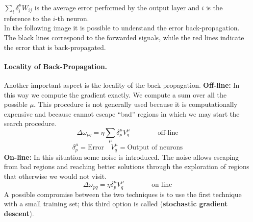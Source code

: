 $\sum_{i} \delta_{i}^{\mu} W_{ij}$ is the average error performed by the output layer and $i$ is the reference to the $i$-th neuron.\\
In the following image it is possible to understand the error back-propagation. The black lines correspond to the forwarded signals, while the red lines indicate the error that is back-propagated.

\paragraph*{Locality of Back-Propagation.} Another important aspect is the locality of the back-propagation.
\textbf{Off-line:} In this way we compute the gradient exactly. We compute a sum over all the possible $\mu$. This procedure is not generally used because it is computationally expensive and because cannot escape ``bad'' regions in which we may start the search procedure.
$$\Delta \omega_{pq} = \eta \sum_{\mu} \delta_{p}^{\mu} V_{q}^{\mu} \qquad \qquad \text{off-line}$$
$$\delta_{p}^{\mu} = \text{Error} \quad V_{q}^{\mu} = \text{Output of neurons}$$
\textbf{On-line:} In this situation some noise is introduced. The noise allows escaping from bad regions and reaching better solutions through the exploration of regions that otherwise we would not visit.
$$\Delta \omega_{pq} = \eta\delta_ {p}^{\mu} V_{q}^{\mu} \qquad \qquad \text{on-line}$$
A possible compromise between the two techniques is to use the first technique with a small training set; this third option is called (\textbf{stochastic gradient descent}).

